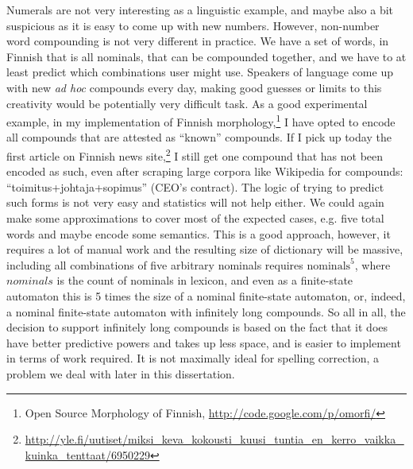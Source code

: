 \documentclass[officiallayout]{unihelcompling}
\begin{document}
Numerals are not very interesting as a linguistic example, and maybe also a bit
suspicious as it is easy to come up with new numbers. However, non-number word
compounding is not very different in practice. We have a set of words, in
Finnish that is all nominals, that can be compounded together, and we have to
at least predict which combinations user might use. Speakers of language come
up with new \emph{ad hoc} compounds every day, making good guesses or limits to
this creativity would be potentially very difficult task. As a good
experimental example, in my implementation of Finnish morphology,\footnote{Open
Source Morphology of Finnish, \url{http://code.google.com/p/omorfi/}} I have
opted to encode all compounds that are attested as ``known'' compounds. If I
pick up today the first article on Finnish news
site,\footnote{\url{http://yle.fi/uutiset/miksi_keva_kokousti_kuusi_tuntia_en_kerro_vaikka_kuinka_tenttaat/6950229}}
I still get one compound that has not been encoded as such, even after scraping
large corpora like Wikipedia for compounds: ``toimitus+johtaja+sopimus'' (CEO's
contract). The logic of trying to predict such forms is not very easy and
statistics will not help either. We could again make some approximations to
cover most of the expected cases, e.g. five total words and maybe encode some
semantics. This is a good approach, however, it requires a lot of manual work
and the resulting size of dictionary will be massive, including all
combinations of five arbitrary nominals requires $\mathrm{nominals}^5$, where
$nominals$ is the count of nominals in lexicon, and even as a finite-state
automaton this is 5 times the size of a nominal finite-state automaton,
or, indeed, a nominal finite-state automaton with infinitely long
compounds. So all in all, the decision to support infinitely long compounds is
based on the fact that it does have better predictive powers and takes up less
space, and is easier to implement in terms of work required.  It is not
maximally ideal for spelling correction, a problem we deal with later in this
dissertation.
\end{document}
